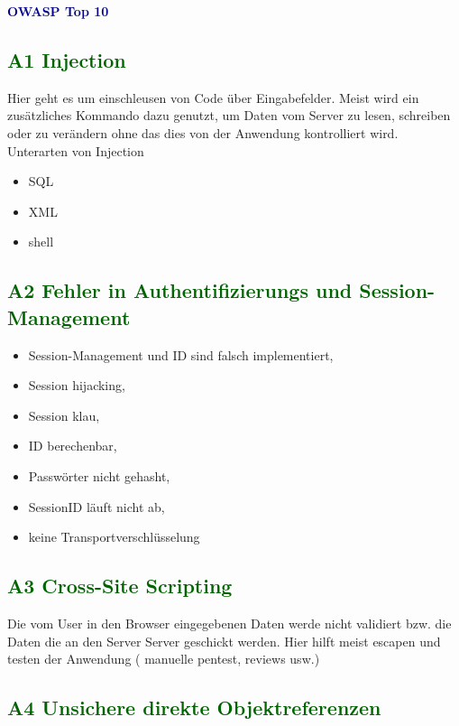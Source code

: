 \textbf{\textcolor{darkblue}{ OWASP Top 10}}~

\subsection*{\textcolor{darkgreen}{A1 Injection}}

Hier geht es um einschleusen von Code über Eingabefelder. Meist wird ein zusätzliches Kommando
dazu genutzt, um Daten vom Server zu lesen, schreiben oder zu verändern ohne das dies von
der Anwendung kontrolliert wird.
Unterarten von Injection
	\begin{itemize}
	\item SQL
	\item XML
	\item shell
	\end{itemize}

\subsection*{\textcolor{darkgreen}{A2 Fehler in Authentifizierungs und Session-Management}}

	\begin{itemize}
	\item Session-Management und ID sind falsch implementiert,
	\item Session hijacking,
	\item Session klau, 
	\item ID berechenbar,
	\item Passwörter nicht gehasht,
	\item SessionID läuft nicht ab,
	\item keine Transportverschlüsselung
	\end{itemize}

\subsection*{\textcolor{darkgreen}{A3 Cross-Site Scripting}}

Die vom User in den Browser eingegebenen Daten werde nicht validiert bzw. die Daten die an den Server
Server geschickt werden. Hier hilft meist escapen und testen der Anwendung ( manuelle pentest, reviews usw.)

\subsection*{\textcolor{darkgreen}{A4 Unsichere direkte Objektreferenzen}}


